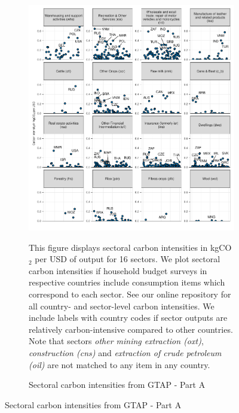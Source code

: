 \begin{figure}[ht!]
  \centering
  \caption{Sectoral carbon intensities from GTAP} \label{fig:GTAP}\label{fig:B}
  \begin{subfigure}[b]{\textwidth}
  \centering
  \includegraphics{Analysis_Carbon_Intensities_GTAP/Figure_2.1.1_A_2017B.pdf}
  \caption{Sectoral carbon intensities from GTAP - Part A} \label{fig:B1}  
  \begin{subcaption2}
    This figure displays sectoral carbon intensities in kgCO$_{2}$ per USD of output for 16 sectors. We plot sectoral carbon intensities if household budget surveys in respective countries include consumption items which correspond to each sector. See our online repository for all country- and sector-level carbon intensities. We include labels with country codes if sector outputs are relatively carbon-intensive compared to other countries. Note that sectors \textit{other mining extraction (oxt)}, \textit{construction (cns)} and \textit{extraction of crude petroleum (oil)} are not matched to any item in any country.
  \end{subcaption2}
\end{subfigure}
\end{figure}

